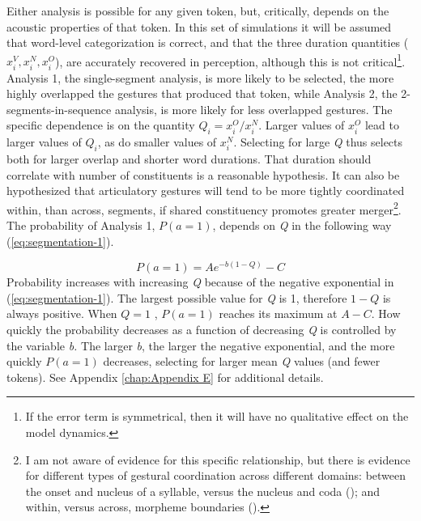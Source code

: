 Either analysis is possible for any given token, but, critically,
depends on the acoustic properties of that token. In this set of simulations
it will be assumed that word-level categorization is correct, and
that the three duration quantities ($x_{i}^{V},x_{i}^{N},x_{i}^{O}$),
are accurately recovered in perception, although this is not critical\footnote{If the error term is symmetrical, then it will have no qualitative
effect on the model dynamics.}. Analysis 1, the single-segment analysis, is more likely to be selected,
the more highly overlapped the gestures that produced that token,
while Analysis 2, the 2-segments-in-sequence analysis, is more likely
for less overlapped gestures. The specific dependence is on the quantity
$Q_{i}={x_{i}^{O}}/{x_{i}^{N}}$. Larger values of $x_{i}^{O}$
lead to larger values of $Q_{i}$, as do smaller values of $x_{i}^{N}$.
Selecting for large \emph{Q} thus selects both for larger overlap
and shorter word durations. That duration should correlate with number
of constituents is a reasonable hypothesis. It can also be hypothesized
that articulatory gestures will tend to be more tightly coordinated
within, than across, segments, if shared constituency promotes greater
merger\footnote{I am not aware of evidence for this specific relationship, but there
is evidence for different types of gestural coordination across different
domains: between the onset and nucleus of a syllable, versus the nucleus
and coda (\citealt{Browman1988,byrd1996influences}); and within,
versus across, morpheme boundaries (\citealt{Cho2001}).}. The probability of Analysis 1, $P(a=1)$, depends on \emph{Q} in
the following way (\ref{eq:segmentation-1}).

\begin{equation}
P(a=1)=Ae^{-b(1-Q)}-C\label{eq:segmentation-1}
\end{equation}
Probability increases with increasing \emph{Q} because of the negative
exponential in (\ref{eq:segmentation-1}). The largest possible value
for \emph{Q} is 1, therefore $1-Q$ is always positive. When $Q=1$
, $P(a=1)$ reaches its maximum at $A-C$. How quickly the probability
decreases as a function of decreasing \emph{Q} is controlled by the
variable \emph{b. }The larger \emph{b}, the larger the negative exponential,
and the more quickly $P(a=1)$ decreases, selecting for larger mean
\emph{Q} values (and fewer tokens). See Appendix \ref{chap:Appendix E}
for additional details.

